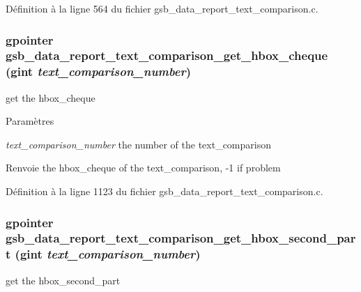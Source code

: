 Définition à la ligne 564 du fichier gsb\_\-data\_\-report\_\-text\_\-comparison.c.

\subsubsection[{gsb\_\-data\_\-report\_\-text\_\-comparison\_\-get\_\-hbox\_\-cheque}]{\setlength{\rightskip}{0pt plus 5cm}gpointer gsb\_\-data\_\-report\_\-text\_\-comparison\_\-get\_\-hbox\_\-cheque (gint {\em text\_\-comparison\_\-number})}\label{gsb__data__report__text__comparison_8h_aa0a5801ae659805b7d921d4da80d42d0}
get the hbox\_\-cheque


\begin{DoxyParams}{Paramètres}
\item[{\em text\_\-comparison\_\-number}]the number of the text\_\-comparison\end{DoxyParams}
\begin{DoxyReturn}{Renvoie}
the hbox\_\-cheque of the text\_\-comparison, -\/1 if problem 
\end{DoxyReturn}


Définition à la ligne 1123 du fichier gsb\_\-data\_\-report\_\-text\_\-comparison.c.

\subsubsection[{gsb\_\-data\_\-report\_\-text\_\-comparison\_\-get\_\-hbox\_\-second\_\-part}]{\setlength{\rightskip}{0pt plus 5cm}gpointer gsb\_\-data\_\-report\_\-text\_\-comparison\_\-get\_\-hbox\_\-second\_\-part (gint {\em text\_\-comparison\_\-number})}\label{gsb__data__report__text__comparison_8h_a43508d76f884118227a69a74796f653d}
get the hbox\_\-second\_\-part


